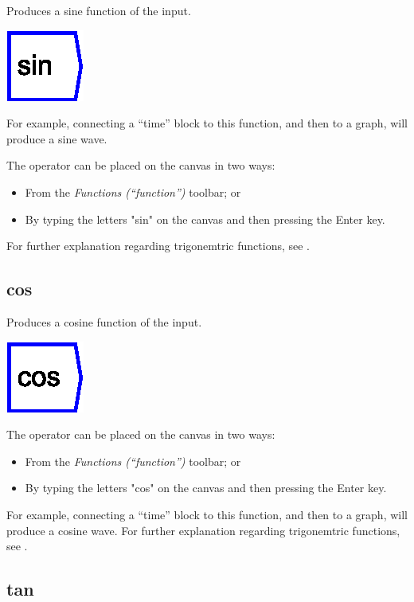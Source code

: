 \label{Operation:sin} Produces a sine function of the input.

\includegraphics{images/sine}

For example, connecting a ``time'' block to this function, and then
to a graph, will produce a sine wave.

The operator can be placed on the canvas in two ways:
\begin{itemize}
\item From the \emph{Functions (``function'')} toolbar; or 
\item By typing the letters "sin" on the canvas and then pressing the
Enter key. 
\end{itemize}
For further explanation regarding trigonemtric functions, see .

\subsection{cos}

\label{Operation:cos} Produces a cosine function of the input.

\includegraphics{images/cosine}

The operator can be placed on the canvas in two ways:
\begin{itemize}
\item From the \emph{Functions (``function'')} toolbar; or 
\item By typing the letters "cos" on the canvas and then pressing the
Enter key.
\end{itemize}
For example, connecting a ``time'' block to this function, and then
to a graph, will produce a cosine wave. For further explanation regarding
trigonemtric functions, see .

\subsection{tan}

